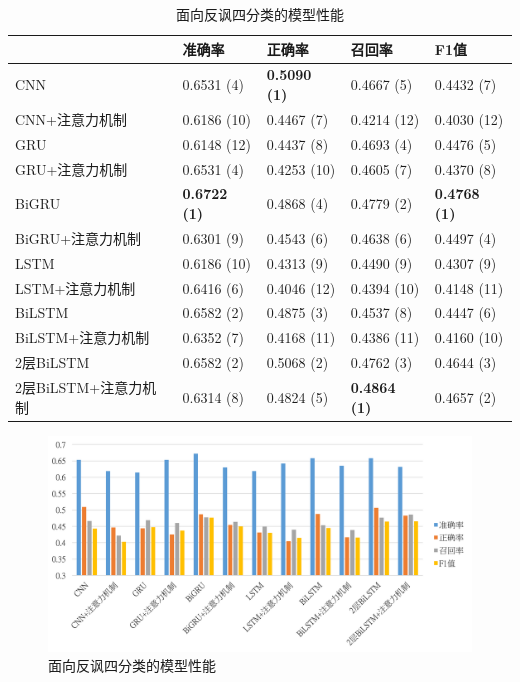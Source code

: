 \begin{table}[htb]
  \centering
  \begin{minipage}[t]{\linewidth}
  \caption{面向反讽四分类的模型性能}
  \label{tab:exp_irony_det_B_result}
    \begin{tabularx}{\linewidth}{X|llll}
    \toprule[1.5pt]
    & 准确率 & 正确率 & 召回率 & F1值 \\
    \hline
    CNN & 0.6531 (4) & \bf 0.5090 (1) & 0.4667 (5) & 0.4432 (7) \\ %
    CNN+注意力机制 & 0.6186 (10) & 0.4467 (7) & 0.4214 (12) & 0.4030 (12) \\ %
    \hline
    GRU & 0.6148 (12) & 0.4437 (8) & 0.4693 (4) & 0.4476 (5) \\ %
    GRU+注意力机制 & 0.6531 (4) & 0.4253 (10) & 0.4605 (7) & 0.4370 (8) \\ %
    \hline
    BiGRU & \bf 0.6722 (1) & 0.4868 (4) & 0.4779 (2) & \bf 0.4768 (1) \\ %
    BiGRU+注意力机制 & 0.6301 (9) & 0.4543 (6) & 0.4638 (6) & 0.4497 (4) \\ %
    \hline
    LSTM & 0.6186 (10) & 0.4313 (9) & 0.4490 (9) & 0.4307 (9) \\ %
    LSTM+注意力机制 & 0.6416 (6) & 0.4046 (12) & 0.4394 (10) & 0.4148 (11) \\ %
    \hline
    BiLSTM & 0.6582 (2) & 0.4875 (3) & 0.4537 (8) & 0.4447 (6) \\ %
    BiLSTM+注意力机制 & 0.6352 (7) & 0.4168 (11) & 0.4386 (11) & 0.4160 (10) \\ %
    \hline
    2层BiLSTM & 0.6582 (2) & 0.5068 (2) & 0.4762 (3) & 0.4644 (3) \\ %
    2层BiLSTM+注意力机制 & 0.6314 (8) & 0.4824 (5) & \bf 0.4864 (1) & 0.4657 (2) \\ %
    \bottomrule[1.5pt]
    \end{tabularx}
  \end{minipage}
\end{table}

\begin{figure}[H]
  \centering
  \includegraphics[width=\textwidth]{img/exp_irony_det_B_single_result_bar.png}
  \caption{面向反讽四分类的模型性能}
  \label{fig:exp_irony_det_B_single_result_bar}
\end{figure}

